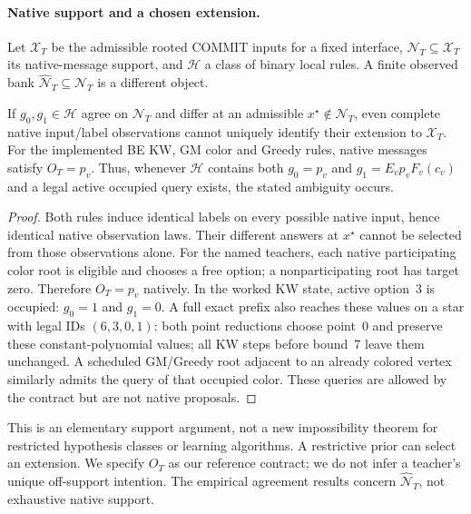 \paragraph{Native support and a chosen extension.}
Let $\mathcal X_T$ be the admissible rooted COMMIT inputs for a fixed
interface, $\mathcal N_T\subseteq\mathcal X_T$ its native-message support,
and $\mathcal H$ a class of binary local rules. A finite observed bank
$\widehat{\mathcal N}_T\subseteq\mathcal N_T$ is a different object.
\begin{proposition}\label{prop:support}
If $g_0,g_1\in\mathcal H$ agree on $\mathcal N_T$ and differ at an
admissible $x^\star\notin\mathcal N_T$, even complete native input/label
observations cannot uniquely identify their extension to $\mathcal X_T$.
For the implemented BE KW, GM color and Greedy rules, native messages
satisfy $O_T=p_v$. Thus, whenever $\mathcal H$ contains both
$g_0=p_v$ and $g_1=E_vp_vF_v(c_v)$ and a legal active occupied query exists,
the stated ambiguity occurs.
\end{proposition}
\begin{proof}
Both rules induce identical labels on every possible native input, hence
identical native observation laws. Their different answers at $x^\star$
cannot be selected from those observations alone. For the named teachers,
each native participating color root is eligible and chooses a free option;
a nonparticipating root has target zero. Therefore $O_T=p_v$ natively.
In the worked KW state, active option~3 is occupied: $g_0=1$ and $g_1=0$.
A full exact prefix also reaches these values on a star with legal IDs
$(6,3,0,1)$: both point reductions choose point~0 and preserve these
constant-polynomial values; all KW steps before bound~7 leave them unchanged.
A scheduled GM/Greedy root adjacent to an already colored vertex similarly
admits the query of that occupied color. These queries are allowed by the
contract but are not native proposals.
\end{proof}
This is an elementary support argument, not a new impossibility theorem for
restricted hypothesis classes or learning algorithms. A restrictive prior
can select an extension. We specify $O_T$ as our reference contract; we do
not infer a teacher's unique off-support intention. The empirical agreement
results concern $\widehat{\mathcal N}_T$, not exhaustive native support.

